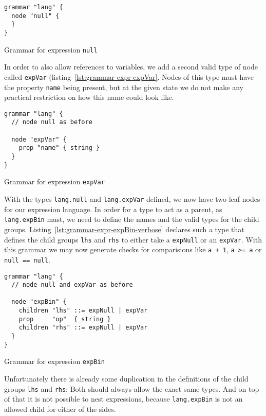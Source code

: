 \documentclass[sigconf,review=true]{acmart}
\begin{document}
\begin{listing}[H]
\begin{verbatim}
grammar "lang" {
  node "null" {
  }
}
\end{verbatim}
\caption{Grammar for expression \texttt{null}}
\label{lst:grammar-expr-null}
\end{listing}

In order to also allow references to variables, we add a second valid type of node called \texttt{expVar} (listing~\ref{lst:grammar-expr-expVar}. Nodes of this type must have the property \texttt{name} being present, but at the given state we do not make any practical restriction on how this name could look like.

\begin{listing}[H]
\begin{verbatim}
grammar "lang" {
  // node null as before

  node "expVar" {
    prop "name" { string }
  }
}
\end{verbatim}
\caption{Grammar for expression \texttt{expVar}}
\label{lst:grammar-expr-expVar}
\end{listing}

With the types \texttt{lang.null} and \texttt{lang.expVar} defined, we now have two leaf nodes for our expression language. In order for a type to act as a parent, as \texttt{lang.expBin} must, we need to define the names and the valid types for the child groups. Listing~\ref{lst:grammar-expr-expBin-verbose} declares such a type that defines the child groups \texttt{lhs} and \texttt{rhs} to either take a \texttt{expNull} or an \texttt{expVar}. With this grammar we may now generate checks for comparisions like \texttt{a + 1}, \texttt{a >= a} or \texttt{null == null}.

\begin{listing}[H]
\begin{verbatim}
grammar "lang" {
  // node null and expVar as before

  node "expBin" {
    children "lhs" ::= expNull | expVar
    prop     "op"  { string }
    children "rhs" ::= expNull | expVar
  }
}
\end{verbatim}
\caption{Grammar for expression \texttt{expBin}}
\label{lst:grammar-expr-expBin-verbose}
\end{listing}

Unfortunately there is already some duplication in the definitions of the child groups \texttt{lhs} and \texttt{rhs}: Both should always allow the exact same types. And on top of that it is not possible to nest expressions, because \texttt{lang.expBin} is not an allowed child for either of the sides.
\end{document}
